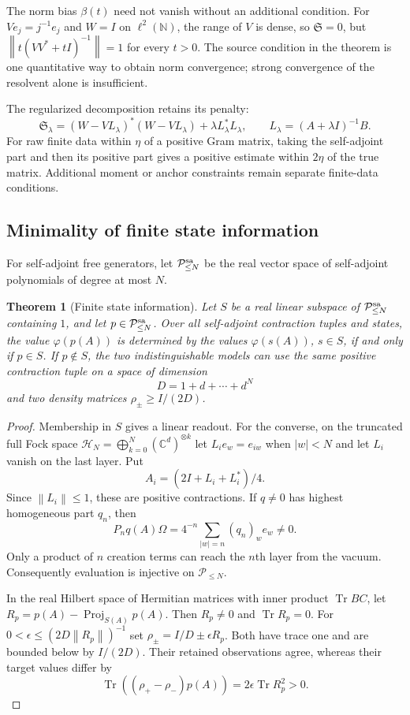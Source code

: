 \documentclass[11pt,a4paper]{amsart}
\numberwithin{equation}{section}
\newtheorem{theorem}{Theorem}[section]
\theoremstyle{definition}
\theoremstyle{remark}
\newcommand{\C}{\mathbb C}
\newcommand{\N}{\mathbb N}
\newcommand{\HH}{\mathcal H}
\newcommand{\PP}{\mathcal P}
\DeclareMathOperator{\Tr}{Tr}
\newcommand{\norm}[1]{\left\lVert#1\right\rVert}
\begin{document}
The norm bias $\beta(t)$ need not vanish without an additional condition. For $Ve_j=j^{-1}e_j$ and $W=I$ on $\ell^2(\N)$, the range of $V$ is dense, so $\mathfrak S=0$, but
$\norm{t(VV^*+tI)^{-1}}=1$ for every $t>0$. The source condition in the theorem is one quantitative way to obtain norm convergence; strong convergence of the resolvent alone is insufficient.

The regularized decomposition retains its penalty:
\[
 \mathfrak S_\lambda=(W-VL_\lambda)^*(W-VL_\lambda)
                    +\lambda L_\lambda^*L_\lambda,
 \qquad L_\lambda=(A+\lambda I)^{-1}B.
\]
For raw finite data within $\eta$ of a positive Gram matrix, taking the self-adjoint part and then its positive part gives a positive estimate within $2\eta$ of the true matrix. Additional moment or anchor constraints remain separate finite-data conditions.

\subsection{Minimality of finite state information}
For self-adjoint free generators, let $\PP_{\le N}^{\rm sa}$ be the real vector space of self-adjoint polynomials of degree at most $N$.
\begin{theorem}[Finite state information]\label{thm:positive_minimality}
Let $S$ be a real linear subspace of $\PP_{\le N}^{\rm sa}$ containing $1$, and let $p\in\PP_{\le N}^{\rm sa}$. Over all self-adjoint contraction tuples and states, the value $\varphi(p(A))$ is determined by the values $\varphi(s(A))$, $s\in S$, if and only if $p\in S$. If $p\notin S$, the two indistinguishable models can use the same positive contraction tuple on a space of dimension
\[
 D=1+d+\cdots+d^N
\]
and two density matrices $\rho_\pm\ge I/(2D)$.
\end{theorem}
\begin{proof}
Membership in $S$ gives a linear readout. For the converse, on the truncated full Fock space
$\HH_N=\bigoplus_{k=0}^N(\C^d)^{\otimes k}$
let $L_ie_w=e_{iw}$ when $|w|<N$ and let $L_i$ vanish on the last layer. Put
\begin{equation}\label{eq:positive_fock_witness}
 A_i=(2I+L_i+L_i^*)/4.
\end{equation}
Since $\norm{L_i}\le1$, these are positive contractions. If $q\ne0$ has highest homogeneous part $q_n$, then
\begin{equation}\label{eq:fock_top_injective}
 P_nq(A)\Omega=4^{-n}\sum_{|w|=n}(q_n)_we_w\ne0.
\end{equation}
Only a product of $n$ creation terms can reach the $n$th layer from the vacuum. Consequently evaluation is injective on $\PP_{\le N}$.

In the real Hilbert space of Hermitian matrices with inner product $\Tr BC$, let
$R_p=p(A)-\operatorname{Proj}_{S(A)}p(A)$.
Then $R_p\ne0$ and $\Tr R_p=0$. For $0<\epsilon\le(2D\norm{R_p})^{-1}$ set
$\rho_\pm=I/D\pm\epsilon R_p$.
Both have trace one and are bounded below by $I/(2D)$. Their retained observations agree, whereas their target values differ by
\[
 \Tr((\rho_+-\rho_-)p(A))=2\epsilon\Tr R_p^2>0.
\]
\end{proof}
\end{document}
